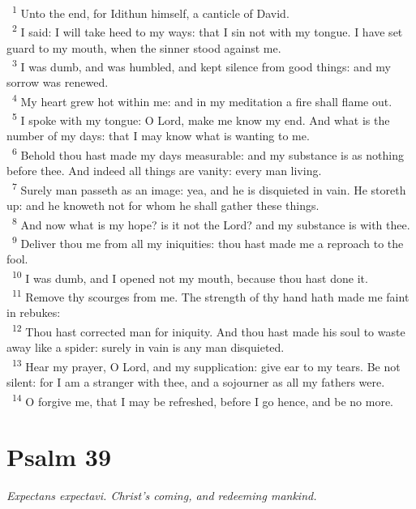 \documentclass[a5paper,12pt]{article}
\begin{document}
\begin{multicols*}{2}
~\textsuperscript{1} Unto the end, for Idithun himself, a canticle of David.\\
~\textsuperscript{2} I said: I will take heed to my ways: that I sin not with my tongue. I have set guard to my mouth, when the sinner stood against me.\\
~\textsuperscript{3} I was dumb, and was humbled, and kept silence from good things: and my sorrow was renewed.\\
~\textsuperscript{4} My heart grew hot within me: and in my meditation a fire shall flame out.\\
~\textsuperscript{5} I spoke with my tongue: O Lord, make me know my end. And what is the number of my days: that I may know what is wanting to me.\\
~\textsuperscript{6} Behold thou hast made my days measurable: and my substance is as nothing before thee. And indeed all things are vanity: every man living.\\
~\textsuperscript{7} Surely man passeth as an image: yea, and he is disquieted in vain. He storeth up: and he knoweth not for whom he shall gather these things.\\
~\textsuperscript{8} And now what is my hope? is it not the Lord? and my substance is with thee.\\
~\textsuperscript{9} Deliver thou me from all my iniquities: thou hast made me a reproach to the fool.\\
~\textsuperscript{10} I was dumb, and I opened not my mouth, because thou hast done it.\\
~\textsuperscript{11} Remove thy scourges from me. The strength of thy hand hath made me faint in rebukes:\\
~\textsuperscript{12} Thou hast corrected man for iniquity. And thou hast made his soul to waste away like a spider: surely in vain is any man disquieted.\\
~\textsuperscript{13} Hear my prayer, O Lord, and my supplication: give ear to my tears. Be not silent: for I am a stranger with thee, and a sojourner as all my fathers were.\\
~\textsuperscript{14} O forgive me, that I may be refreshed, before I go hence, and be no more.\\

\section{Psalm 39}
\label{sec:orgac5942c}
\emph{Expectans expectavi. Christ's coming, and redeeming mankind.}\\


\end{multicols*}
\end{document}
